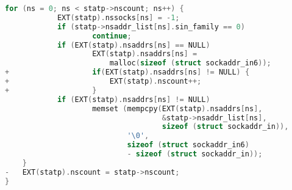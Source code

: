 \begin{lstlisting}[firstnumber=426, label={lst:res_send.c}, caption={\texttt{resolv/res\_send.c}}, language=C]
    for (ns = 0; ns < statp->nscount; ns++) {
            EXT(statp).nssocks[ns] = -1;
            if (statp->nsaddr_list[ns].sin_family == 0)
                    continue;
            if (EXT(statp).nsaddrs[ns] == NULL)
                    EXT(statp).nsaddrs[ns] =
                        malloc(sizeof (struct sockaddr_in6));
+                   if(EXT(statp).nsaddrs[ns] != NULL) {
+                       EXT(statp).nscount++;
+                   }
            if (EXT(statp).nsaddrs[ns] != NULL)
                    memset (mempcpy(EXT(statp).nsaddrs[ns],
                                    &statp->nsaddr_list[ns],
                                    sizeof (struct sockaddr_in)),
                            '\0',
                            sizeof (struct sockaddr_in6)
                            - sizeof (struct sockaddr_in));
    }
-   EXT(statp).nscount = statp->nscount;
}
\end{lstlisting}